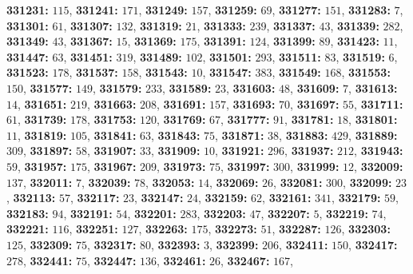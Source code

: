 \textsf{\bfseries 331231:} $115$, \textsf{\bfseries 331241:} $171$, \textsf{\bfseries 331249:} $157$, \textsf{\bfseries 331259:} $69$, \textsf{\bfseries 331277:} $151$, \textsf{\bfseries 331283:} $7$, \textsf{\bfseries 331301:} $61$, \textsf{\bfseries 331307:} $132$, \textsf{\bfseries 331319:} $21$, \textsf{\bfseries 331333:} $239$, \textsf{\bfseries 331337:} $43$, \textsf{\bfseries 331339:} $282$, \textsf{\bfseries 331349:} $43$, \textsf{\bfseries 331367:} $15$, \textsf{\bfseries 331369:} $175$, \textsf{\bfseries 331391:} $124$, \textsf{\bfseries 331399:} $89$, \textsf{\bfseries 331423:} $11$, \textsf{\bfseries 331447:} $63$, \textsf{\bfseries 331451:} $319$, \textsf{\bfseries 331489:} $102$, \textsf{\bfseries 331501:} $293$, \textsf{\bfseries 331511:} $83$, \textsf{\bfseries 331519:} $6$, \textsf{\bfseries 331523:} $178$, \textsf{\bfseries 331537:} $158$, \textsf{\bfseries 331543:} $10$, \textsf{\bfseries 331547:} $383$, \textsf{\bfseries 331549:} $168$, \textsf{\bfseries 331553:} $150$, \textsf{\bfseries 331577:} $149$, \textsf{\bfseries 331579:} $233$, \textsf{\bfseries 331589:} $23$, \textsf{\bfseries 331603:} $48$, \textsf{\bfseries 331609:} $7$, \textsf{\bfseries 331613:} $14$, \textsf{\bfseries 331651:} $219$, \textsf{\bfseries 331663:} $208$, \textsf{\bfseries 331691:} $157$, \textsf{\bfseries 331693:} $70$, \textsf{\bfseries 331697:} $55$, \textsf{\bfseries 331711:} $61$, \textsf{\bfseries 331739:} $178$, \textsf{\bfseries 331753:} $120$, \textsf{\bfseries 331769:} $67$, \textsf{\bfseries 331777:} $91$, \textsf{\bfseries 331781:} $18$, \textsf{\bfseries 331801:} $11$, \textsf{\bfseries 331819:} $105$, \textsf{\bfseries 331841:} $63$, \textsf{\bfseries 331843:} $75$, \textsf{\bfseries 331871:} $38$, \textsf{\bfseries 331883:} $429$, \textsf{\bfseries 331889:} $309$, \textsf{\bfseries 331897:} $58$, \textsf{\bfseries 331907:} $33$, \textsf{\bfseries 331909:} $10$, \textsf{\bfseries 331921:} $296$, \textsf{\bfseries 331937:} $212$, \textsf{\bfseries 331943:} $59$, \textsf{\bfseries 331957:} $175$, \textsf{\bfseries 331967:} $209$, \textsf{\bfseries 331973:} $75$, \textsf{\bfseries 331997:} $300$, \textsf{\bfseries 331999:} $12$, \textsf{\bfseries 332009:} $137$, \textsf{\bfseries 332011:} $7$, \textsf{\bfseries 332039:} $78$, \textsf{\bfseries 332053:} $14$, \textsf{\bfseries 332069:} $26$, \textsf{\bfseries 332081:} $300$, \textsf{\bfseries 332099:} $23$, \textsf{\bfseries 332113:} $57$, \textsf{\bfseries 332117:} $23$, \textsf{\bfseries 332147:} $24$, \textsf{\bfseries 332159:} $62$, \textsf{\bfseries 332161:} $341$, \textsf{\bfseries 332179:} $59$, \textsf{\bfseries 332183:} $94$, \textsf{\bfseries 332191:} $54$, \textsf{\bfseries 332201:} $283$, \textsf{\bfseries 332203:} $47$, \textsf{\bfseries 332207:} $5$, \textsf{\bfseries 332219:} $74$, \textsf{\bfseries 332221:} $116$, \textsf{\bfseries 332251:} $127$, \textsf{\bfseries 332263:} $175$, \textsf{\bfseries 332273:} $51$, \textsf{\bfseries 332287:} $126$, \textsf{\bfseries 332303:} $125$, \textsf{\bfseries 332309:} $75$, \textsf{\bfseries 332317:} $80$, \textsf{\bfseries 332393:} $3$, \textsf{\bfseries 332399:} $206$, \textsf{\bfseries 332411:} $150$, \textsf{\bfseries 332417:} $278$, \textsf{\bfseries 332441:} $75$, \textsf{\bfseries 332447:} $136$, \textsf{\bfseries 332461:} $26$, \textsf{\bfseries 332467:} $167$, 
